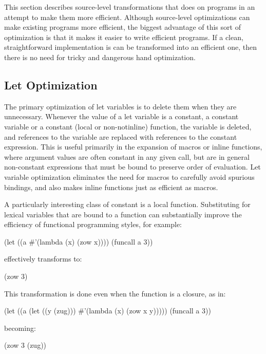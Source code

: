 This section describes source-level transformations that \python{} does on
programs in an attempt to make them more efficient.  Although source-level
optimizations can make existing programs more efficient, the biggest advantage
of this sort of optimization is that it makes it easier to write efficient
programs.  If a clean, straightforward implementation is can be transformed
into an efficient one, then there is no need for tricky and dangerous hand
optimization. 


\subsection{Let Optimization}
\label{let-optimization}

 

The primary optimization of let variables is to delete them when they
are unnecessary.  Whenever the value of a let variable is a constant,
a constant variable or a constant (local or non-notinline) function,
the variable is deleted, and references to the variable are replaced
with references to the constant expression.  This is useful primarily
in the expansion of macros or inline functions, where argument values
are often constant in any given call, but are in general non-constant
expressions that must be bound to preserve order of evaluation.  Let
variable optimization eliminates the need for macros to carefully
avoid spurious bindings, and also makes inline functions just as
efficient as macros.

A particularly interesting class of constant is a local function.
Substituting for lexical variables that are bound to a function can
substantially improve the efficiency of functional programming styles,
for example:
\begin{lisp}
(let ((a #'(lambda (x) (zow x))))
  (funcall a 3))
\end{lisp}
effectively transforms to:
\begin{lisp}
(zow 3)
\end{lisp}
This transformation is done even when the function is a closure, as in:
\begin{lisp}
(let ((a (let ((y (zug)))
           #'(lambda (x) (zow x y)))))
  (funcall a 3))
\end{lisp}
becoming:
\begin{lisp}
(zow 3 (zug))
\end{lisp}

